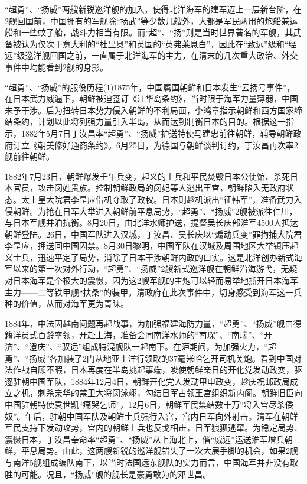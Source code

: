 \documentclass[12pt,UTF8]{ctexbook}
\begin{document}
“超勇”、“扬威”两艘新锐巡洋舰的加入，使得北洋海军的建军迈上一层新台阶，在2舰回国前，中国拥有的军舰除“扬武”等少数几艘外，大都是军民两用的炮船兼运船和一些蚊子船，战斗力相当有限。而“超”、“扬”则是当时世界著名的军舰，其武备被认为仅次于意大利的“杜里奥”和英国的“英弗莱息白”，因此在“致远”级和“经远”级巡洋舰回国之前，一直属于北洋海军的主力，在清末的几次重大政治、外交事件中均能看到2舰的身影。

“超勇”、“扬威”的服役历程(1)1875年，中国属国朝鲜和日本发生“云扬号事件”，在日本武力威逼下，朝鲜被迫签订《江华岛条约》，当时限于海军力量薄弱，中国未予干涉。后为扭转日本势力侵入朝鲜的不利局面，李鸿章指示朝鲜和西方国家缔结条约，计划以此将列强力量引入半岛，从而达到制衡日本的目的。根据这一指示，1882年5月7日丁汝昌率“超勇”、“扬威”护送特使马建忠前往朝鲜，辅导朝鲜政府订立《朝美修好通商条约》。6月25日，为德国与朝鲜谈判订约，丁汝昌再次率2舰前往朝鲜。

1882年7月23日，朝鲜爆发壬午兵变，起义的士兵和平民焚毁日本公使馆、杀死日本官员，攻击闵姓贵族。控制朝鲜政局的闵妃等人逃出王宫，朝鲜陷入无政府状态。太上皇大院君李昰应借机夺取了政权。日本则趁机派出“征韩军”，准备武力入侵朝鲜。为抢在日军大举进入朝鲜前平息局势，“超勇”、“扬威”2舰被派往仁川，与日本军舰并泊抗衡。8月20日，由北洋水师护送，提督吴长庆部淮军4500人抵达朝鲜登陆。26日，中国军队进入汉城，丁汝昌、吴长庆以“煽动兵变”罪拘捕大院君李昰应，押送回中国囚禁。8月30日黎明，中国军队在汉城及周围地区大举镇压起义士兵，迅速平定了局势，消除了日本干涉朝鲜内政的口实。这是北洋创办新式海军以来的第一次对外行动，“超勇”、“扬威”2艘新式巡洋舰在朝鲜沿海游弋，无疑对日本海军是个极大的震慑，因为这2艘军舰的主炮可以轻而易举地撕开日本海军主力——二等铁甲舰“扶桑”的装甲。清政府在此次事件中，切身感受到海军这一兵种的价值，从而对海军更为青睐。

1884年，中法因越南问题再起战事，为加强福建海防力量，“超勇”、“扬威”舰由德籍洋员式百龄率领，开赴上海，准备会同南洋水师的“南琛”、“南瑞”、“开济”、“澄庆”、“驭远”组成特混舰队一起南下。在沪期间，为加强火力，“超勇”、“扬威”各加装了2门从地亚士洋行领取的37毫米哈乞开司机关炮。看到中国对法作战自顾不暇，日本再度在半岛挑起事端，唆使朝鲜亲日的开化党发动政变，驱逐驻朝中国军队，1884年12月4日，朝鲜开化党人发动甲申政变，趁庆祝邮政局成立之机，刺杀亲华的禁卫大将闵泳翊，勾结日军占领王宫组织新内阁。朝鲜旧臣向中国驻朝特使袁世凯“痛哭乞师”，12月6日，朝鲜军民集结数十万“将入宫尽杀倭奴”。午后，驻朝中国军队及朝鲜士兵强行入宫，宫内日军向外射击。清军在朝鲜军民支持下发动攻势，宫内的朝鲜士兵也反戈相击，日军狼狈逃窜。为稳定局势、震慑日本，丁汝昌奉命率“超勇”、“扬威”从上海北上，偕“威远”运送淮军增兵朝鲜，平息局势。由此，这两艘新锐的巡洋舰错失了一次大展手脚的机会，如果2舰与南洋5舰组成编队南下，以当时法国远东舰队的实力而言，中国海军并非没有取胜的可能。况且，“扬威”舰的舰长是豪勇敢为的邓世昌。
\end{document}
